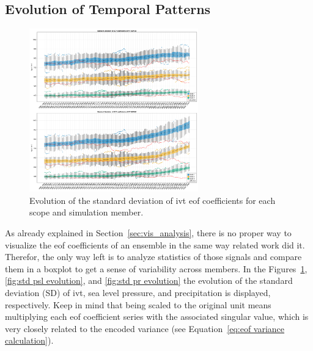\subsection{Evolution of Temporal Patterns}

\begin{figure}[htb]
  \begin{center}
    \includegraphics[width=0.65\textwidth]{figures/std_ivt_50seasons_tempmodescale_3modes.png}
  \end{center}
  \caption{Evolution of the standard deviation of \ac{ivt} \ac{eof} coefficients for each scope and simulation member.}
  \label{fig:std ivt evolution}
\end{figure}

As already explained in Section~\ref{sec:vis_analysis}, there is no proper way to visualize the \ac{eof} coefficients of an ensemble in the same way related work did it. 
Therefor, the only way left is to analyze statistics of those signals and compare them in a boxplot to get a sense of variability across members. 
In the Figures~\ref{fig:std ivt evolution}, \ref{fig:std psl evolution}, and \ref{fig:std pr evolution} the evolution of the standard deviation (SD) of \ac{ivt}, sea level pressure, and precipitation is displayed, respectively. 
Keep in mind that being scaled to the original unit means multiplying each \ac{eof} coefficient series with the associated singular value, which is very closely related to the encoded variance (see Equation~\ref{eq:eof variance calculation}). 


